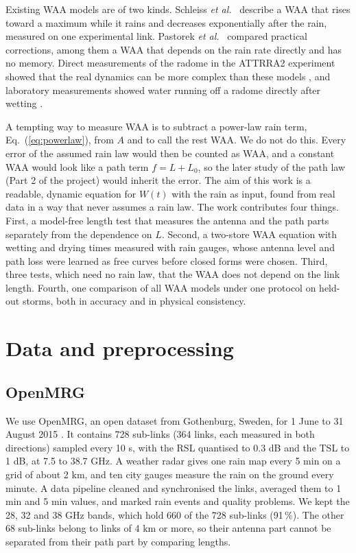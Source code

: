 \documentclass[reprint,aps,pra,amsmath,amssymb,nofootinbib,superscriptaddress]{revtex4-2}
\begin{document}
Existing WAA models are of two kinds. Schleiss \emph{et al.}~\cite{schleiss2013} describe a WAA that rises toward a
maximum while it rains and decreases exponentially after the rain, measured on one experimental link. Pastorek
\emph{et al.}~\cite{pastorek2022} compared practical corrections, among them a WAA that depends on the rain rate
directly and has no memory. Direct measurements of the radome in the ATTRRA2 experiment showed that the real dynamics
can be more complex than these models \cite{tiede2023}, and laboratory measurements showed water running off a radome
directly after wetting \cite{tiede2025}.

A tempting way to measure WAA is to subtract a power-law rain term, Eq.~(\ref{eq:powerlaw}), from $A$ and to call the
rest WAA. We do not do this. Every error of the assumed rain law would then be counted as WAA, and a constant WAA would
look like a path term $f = L + L_0$, so the later study of the path law (Part 2 of the project) would inherit the error.
The aim of this work is a readable, dynamic equation for $W(t)$ with the rain as input, found from real data in a way that
never assumes a rain law. The work contributes four things. First, a model-free length test that measures the antenna
and the path parts separately from the dependence on $L$. Second, a two-store WAA equation with wetting and drying times
measured with rain gauges, whose antenna level and path loss were learned as free curves before closed forms were chosen.
Third, three tests, which need no rain law, that the WAA does not depend on the link length. Fourth, one comparison of all
WAA models under one protocol on held-out storms, both in accuracy and in physical consistency.

\section{Data and preprocessing}
\label{sec:data}

\subsection{OpenMRG}
We use OpenMRG, an open dataset from Gothenburg, Sweden, for 1 June to 31 August 2015 \cite{openmrg}. It contains 728
sub-links (364 links, each measured in both directions) sampled every 10 s, with the RSL quantised to 0.3 dB and the TSL to
1 dB, at 7.5 to 38.7 GHz. A weather radar gives one rain map every 5 min on a grid of about 2 km, and ten city gauges
measure the rain on the ground every minute. A data pipeline cleaned and synchronised the links, averaged them to 1 min
and 5 min values, and marked rain events and quality problems. We kept the 28, 32 and 38 GHz bands, which hold 660 of the
728 sub-links (91\,\%). The other 68 sub-links belong to links of 4 km or more, so their antenna part cannot be separated
from their path part by comparing lengths.
\end{document}
